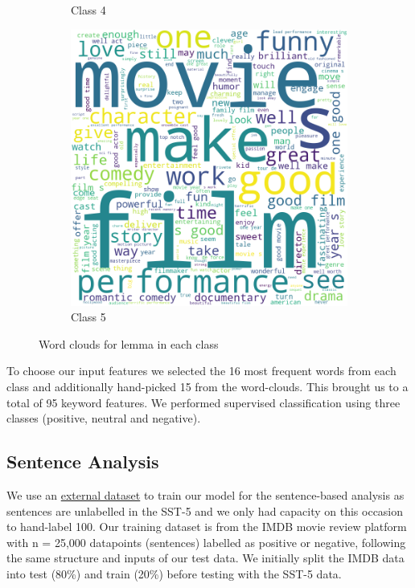 \documentclass[10pt, a4paper]{article}
\begin{document}
\begin{figure}[h]
\begin{subfigure}[b]{0.18\textwidth}
         \caption{Class 4}
         \label{fig:lemma4cloud}
     \end{subfigure}
     \hfill
     \begin{subfigure}[b]{0.18\textwidth}
         \centering
         \includegraphics[width=\textwidth]{lemma5.png}
         \caption{Class 5}
         \label{fig:lemma5cloud}
     \end{subfigure}
     \hfill
    \caption{Word clouds for lemma in each class}
\label{fig:lemmacloud}
\end{figure}

To choose our input features we selected the 16 most frequent words from each class and additionally hand-picked 15 from the word-clouds. This brought us to a total of 95 keyword features. We performed supervised classification using three classes (positive, neutral and negative).


\subsection{Sentence Analysis}
We use an \href{http://ai.stanford.edu/~amaas/data/sentiment/}{external dataset} \cite{maas2011learning} to train our model for the sentence-based analysis as sentences are unlabelled in the SST-5 and we only had capacity on this occasion to hand-label 100. Our training dataset is from the IMDB movie review platform with n = 25,000 datapoints (sentences) labelled as positive or negative, following the same structure and inputs of our test data. We initially split the IMDB data into test (80\%) and train (20\%) before testing with the SST-5 data.
\end{document}
